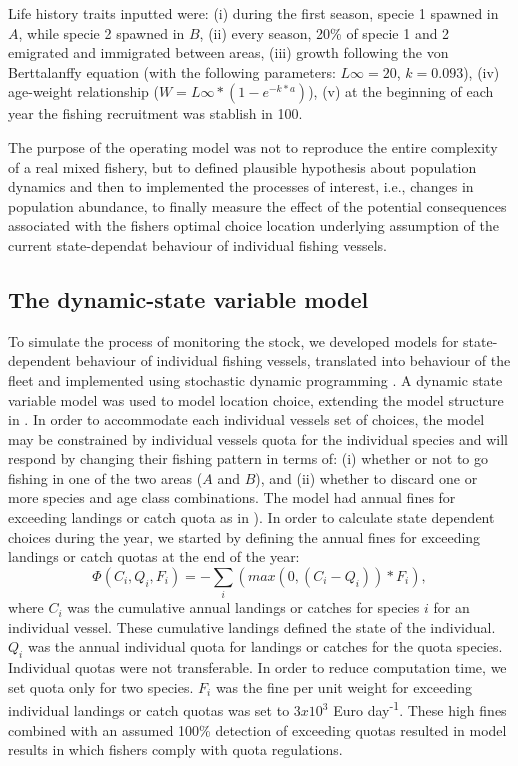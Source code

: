 \documentclass[12pt,oneline,a4paper,numbib]{ouparticle}
\numberwithin{equation}{subsection} %
\begin{document}
Life history traits inputted were: (i)  during the first season, specie 1 spawned in $A$, while specie 2 spawned in $B$, (ii) every season, 20\% of specie 1 and 2 emigrated and immigrated between areas, (iii) growth following the von Berttalanffy equation (with the following parameters: $L\infty= 20$, $k= 0.093$), (iv) age-weight relationship ($W= L\infty*(1-e^{-k*a})$), (v) at the beginning of each year the fishing recruitment was stablish in 100.

The purpose of the operating model was not to reproduce the entire complexity of a real mixed fishery, but to defined plausible hypothesis about population dynamics and then to implemented the processes of interest, i.e., changes in population abundance, to finally measure the effect of the potential consequences associated with the fishers optimal choice location underlying assumption of the current state-dependat behaviour of individual fishing vessels.

\subsection{The dynamic-state variable model}
\label{sec2.2}

To simulate the process of monitoring the stock, we developed models for state-dependent behaviour of individual fishing vessels, translated into behaviour of the fleet and implemented using stochastic dynamic programming \cite{Alzorriz2018, Batsleer2015, ClarkandMangel2000, Dowling2011, Houston1999, Poos2010}. A dynamic state variable model \cite{Houston1999, ClarkandMangel2000} was used to model location choice, extending the model structure in \cite{Batsleer2015}. In order to accommodate each individual vessels set of choices, the model may be constrained by individual vessels quota for the individual species and will respond by changing their fishing pattern in terms of: (i) whether or not to go fishing in one of the two areas ($A$ and $B$), and (ii) whether to discard one or more species and age class combinations. The model had annual fines for exceeding landings or catch quota as in \cite{Alzorriz2018}). In order to calculate state dependent choices during the year, we started by defining the annual fines for exceeding landings or catch quotas at the end of the year:
\begin{equation}
\Phi (C_i, Q_i, F_i)= -\sum_i (max( 0, (C_i - Q_i))* F_i),
\end{equation}
where $C_i$ was the cumulative annual landings or catches for species $i$ for an individual vessel. These cumulative landings defined the state of the individual. $Q_i$ was the annual individual quota for landings or catches for the quota species. Individual quotas were not transferable. In order to reduce computation time, we set quota only for two species. $F_i$ was the fine per unit weight for exceeding individual landings or catch quotas was set to $3 x 10^3$ Euro day\textsuperscript{-1}. These high fines combined with an assumed 100\% detection of exceeding quotas resulted in model results in which fishers comply with quota regulations.
\end{document}
